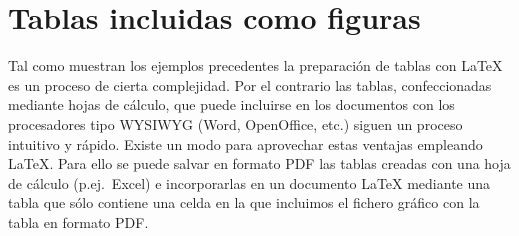 \documentclass[11pt,a4paper]{article}
\begin{document}
\begin{table}[H]
	\centering
	\caption{Tabla escalada}
	\label{tab:escalada}
\end{table}




\section{Tablas incluidas como figuras}
Tal como muestran los ejemplos precedentes la preparación de tablas con \LaTeX{} es un proceso de cierta complejidad. Por el contrario las tablas, confeccionadas mediante hojas de cálculo, que puede incluirse en los documentos con los procesadores tipo \textsc{WYSIWYG} (\textsf{Word}, \textsf{OpenOffice}, etc.) siguen un proceso intuitivo y rápido. Existe un modo para aprovechar estas ventajas empleando \LaTeX{}. Para ello se puede salvar en formato \textsf{PDF} las tablas creadas con una hoja de cálculo (p.ej.\ \textsf{Excel}) e incorporarlas en un documento \LaTeX{} mediante una tabla que sólo contiene una celda en la que incluimos el fichero gráfico con la tabla en formato \textsf{PDF}. 
\end{document}
